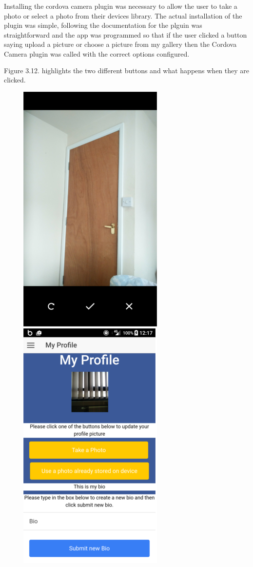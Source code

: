 Installing the cordova camera plugin \cite{cc} was necessary to allow the user to take a photo or select a photo from their devices library. The actual installation of the plugin was simple, following the documentation for the plguin was straightforward and the app was programmed so that if the user clicked a button saying upload a picture or choose a picture from my gallery then the Cordova Camera plugin was called with the correct options configured.

Figure 3.12. highlights the two different buttons and what happens when they are clicked.
\begin{center}
\begin{figure}[H]
\includegraphics[scale=0.5]{images/cs}
\includegraphics[scale=0.5]{images/sc7}

\end{figure}
\end{center}

